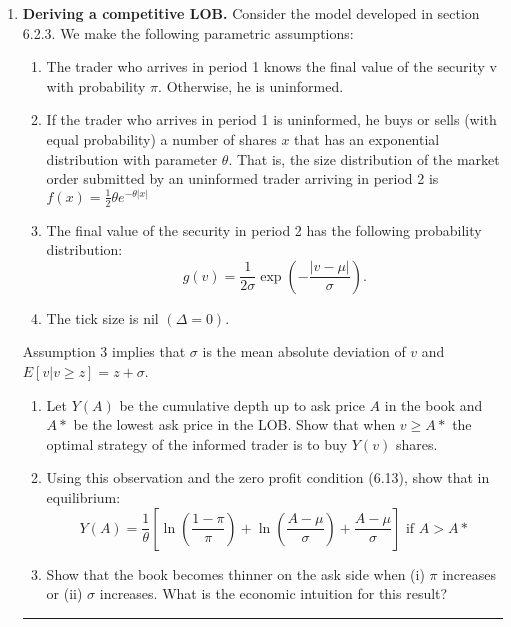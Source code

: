 \documentclass[a4paper]{article}
\title{}
\author{Charlie Bradford}
\date{\today}
\newcommand{\ansline}{\begin{center}\rule{8cm}{0.4pt}\end{center}}
\begin{document}
\maketitle

\begin{enumerate}
  \item \textbf{Deriving a competitive LOB.} Consider the model developed in section 6.2.3.
    We make the following parametric assumptions:
    \begin{enumerate}[label={(\roman*)}]
      \item The trader who arrives in period 1 knows the final value of the security v with
probability $\pi$. Otherwise, he is uninformed.
      \item If the trader who arrives in period 1 is uninformed, he buys or sells (with equal probability) a 
        number of shares $x$ that has an exponential distribution with parameter $\theta$. That is, 
        the size distribution of the market order submitted by an uninformed trader arriving in period 2 is 
        $f(x) = \frac{1}{2}\theta e^{-\theta |x|}$
      \item The final value of the security in period 2 has the following probability distribution:
        \[g(v) = \frac{1}{2\sigma}\exp{\left(-\frac{|v-\mu|}{\sigma}\right)}.\]
      \item The tick size is nil $\left(\Delta = 0\right)$.
    \end{enumerate}
    Assumption 3 implies that $\sigma$ is the mean absolute deviation of $v$ and 
    $E[v | v \geq z] = z + \sigma$.
    \begin{enumerate}
      \item Let $Y(A)$ be the cumulative depth up to ask price $A$ in the book and $A*$ be
        the lowest ask price in the LOB\@. Show that when $v\geq A*$ the optimal strategy of
        the informed trader is to buy $Y (v)$ shares.
      \item Using this observation and the zero profit condition (6.13), show that in equilibrium:
        \[Y(A) = \frac{1}{\theta}\left[\ln{\left(\frac{1-\pi}{\pi}\right)}+\ln{\left(\frac{A-\mu}{\sigma}\right)} + \frac{A-\mu}{\sigma}\right]\text{ if } A > A*\]
      \item Show that the book becomes thinner on the ask side when (i) $\pi$ increases or (ii) $\sigma$ increases. 
        What is the economic intuition for this result?
    \end{enumerate}
    \ansline
\end{enumerate}
\end{document}
